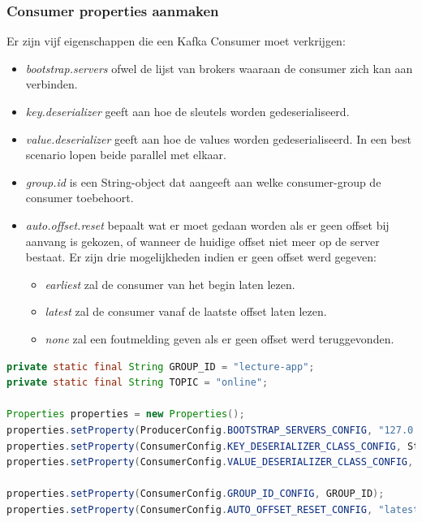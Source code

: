 \documentclass[a4paper,10pt,twoside]{report}
\begin{document}
\subsubsection{Consumer properties aanmaken}

Er zijn vijf eigenschappen die een Kafka Consumer moet verkrijgen:

\begin{itemize}
	\item \textit{bootstrap.servers} ofwel de lijst van brokers waaraan de consumer zich kan aan verbinden.
	\item \textit{key.deserializer} geeft aan hoe de sleutels worden gedeserialiseerd.
	\item \textit{value.deserializer} geeft aan hoe de values worden gedeserialiseerd. In een best scenario lopen beide parallel met elkaar.
	\item \textit{group.id} is een String-object dat aangeeft aan welke consumer-group de consumer toebehoort.
	\item \textit{auto.offset.reset} bepaalt wat er moet gedaan worden als er geen offset bij aanvang is gekozen, of wanneer de huidige offset niet meer op de server bestaat. Er zijn drie mogelijkheden indien er geen offset werd gegeven:
	\begin{itemize}
		\item \textit{earliest} zal de consumer van het begin laten lezen.
		\item \textit{latest} zal de consumer vanaf de laatste offset laten lezen.
		\item \textit{none} zal een foutmelding geven als er geen offset werd teruggevonden. 
	\end{itemize}
\end{itemize}

\begin{lstlisting}[language=Java]
private static final String GROUP_ID = "lecture-app";
private static final String TOPIC = "online";

Properties properties = new Properties();
properties.setProperty(ProducerConfig.BOOTSTRAP_SERVERS_CONFIG, "127.0.0.1:9092"); 
properties.setProperty(ConsumerConfig.KEY_DESERIALIZER_CLASS_CONFIG, StringDeserializer.class.getName());
properties.setProperty(ConsumerConfig.VALUE_DESERIALIZER_CLASS_CONFIG, StringDeserializer.class.getName());

properties.setProperty(ConsumerConfig.GROUP_ID_CONFIG, GROUP_ID);
properties.setProperty(ConsumerConfig.AUTO_OFFSET_RESET_CONFIG, "latest");
\end{lstlisting}
\end{document}
